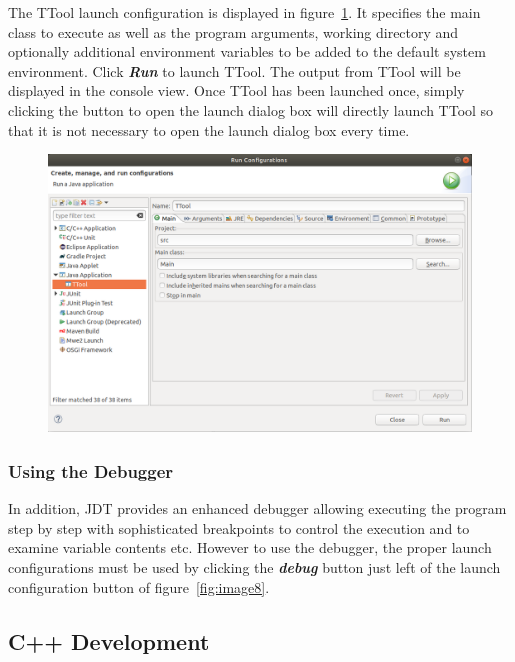 \documentclass[12pt]{article}
\begin{document}
The TTool launch configuration is displayed in figure~\ref{fig:image9}. It
specifies the main class to execute as well as the program arguments, working directory and
optionally additional environment variables to be added to the default system
environment. Click \textbf{\textit{Run}} to launch TTool. The output from TTool will be
displayed in the console view. Once TTool has been launched once, simply
clicking the button to open the launch dialog box will directly launch TTool so
that it is not necessary to open the launch dialog box every time.

\begin{figure}[H]
\begin{center}
\includegraphics[width=\textwidth]{images/image10.png}
\end{center}
\caption{}
\label{fig:image9}
\end{figure}

\subsubsection{Using the Debugger}

In addition, JDT provides an enhanced debugger allowing executing the program
step by step with sophisticated breakpoints to control the execution and to
examine variable contents etc. However to use the debugger, the proper launch
configurations must be used by clicking the \textbf{\textit{debug}}
button just left of the launch configuration button of figure~\ref{fig:image8}.

\subsection{C++ Development}
\end{document}
